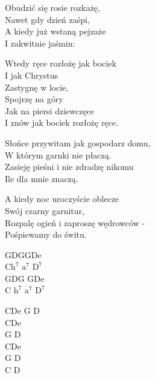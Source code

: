 \begin{text}
    Obudzić się rosie rozkażę,\\
    Nawet gdy dzień zaśpi,\\
    A kiedy już wstaną pejzaże\\
    I zakwitnie jaśmin:

    \vin Wtedy ręce rozłożę jak bociek\\
    \vin I jak Chrystus\\
    \vin Zastygnę w locie,\\
    \vin Spojrzę na góry\\
    \vin Jak na piersi dziewczęce\\
    \vin I znów jak bociek rozłożę ręce.

    Słońce przywitam jak gospodarz domu,\\
    W którym garnki nie płaczą.\\
    Zasieję pieśni i nie zdradzę nikomu\\
    Ile dla mnie znaczą.

    A kiedy noc uroczyście oblecze\\
    Swój czarny garnitur,\\
    Rozpalę ogień i zaproszę wędrowców -\\
    Pośpiewamy do świtu.
\end{text}
\begin{chord}
    GDGGDe\\
    C$\mathrm{h^7}$ $\mathrm{a^7}$ $\mathrm{D^7}$\\
    GDG GDe\\
    C $\mathrm{h^7}$ $\mathrm{a^7}$ $\mathrm{D^7}$

    CDe G D\\
    CDe\\
    G D\\
    CDe\\
    G D\\
    C D
\end{chord}
